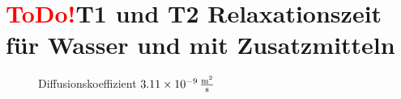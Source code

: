 \section{\textcolor{red}{ToDo!}T1 und T2 Relaxationszeit für Wasser und mit Zusatzmitteln}
\begin{figure}[H]
    \centering
    
    \caption{Diffusionskoeffizient $\SI{3,11e-9}{\frac{\m^2}{s}}$}
\end{figure}
